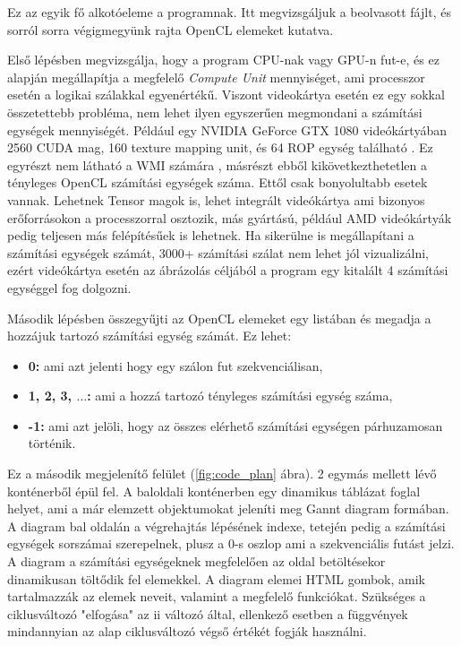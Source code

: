 Ez az egyik fő alkotóeleme a programnak. Itt megvizsgáljuk a beolvasott fájlt, és sorról sorra végigmegyünk rajta OpenCL elemeket kutatva. 

Első lépésben megvizsgálja, hogy a program CPU-nak vagy GPU-n fut-e, és ez alapján megállapítja a megfelelő \textit{Compute Unit} mennyiséget, ami processzor esetén a logikai szálakkal egyenértékű. Viszont videokártya esetén ez egy sokkal összetettebb probléma, nem lehet ilyen egyszerűen megmondani a számítási egységek mennyiségét. Például egy NVIDIA GeForce GTX 1080 videókártyában 2560 CUDA mag, 160 texture mapping unit, és 64 ROP egység található \cite{1080}. Ez egyrészt nem látható a WMI számára \cite{wmi}, másrészt ebből kikövetkezthetetlen a tényleges OpenCL számítási egységek száma. Ettől csak bonyolultabb esetek vannak. Lehetnek Tensor \cite{tensor} magok is, lehet integrált videókártya ami bizonyos erőforrásokon a processzorral osztozik, más gyártású, például AMD videókártyák pedig teljesen más felépítésűek is lehetnek. Ha sikerülne is megállapítani a számítási egységek számát, 3000+ számítási szálat nem lehet jól vizualizálni, ezért videókártya esetén az ábrázolás céljából a program egy kitalált 4 számítási egységgel fog dolgozni.

Második lépésben összegyűjti az OpenCL elemeket egy listában és megadja a hozzájuk tartozó számítási egység számát. Ez lehet:
\begin{itemize}
\item\textbf{0:}  ami azt jelenti hogy egy szálon fut szekvenciálisan,
\item\textbf{1, 2, 3, $\ldots$:}  ami a hozzá tartozó tényleges számítási egység száma,
\item\textbf{-1:}  ami azt jelöli, hogy az összes elérhető számítási egységen párhuzamosan történik.
\end{itemize}




Ez a második megjelenítő felület (\ref{fig:code_plan} ábra). 2 egymás mellett lévő konténerből épül fel.
A baloldali konténerben egy dinamikus táblázat foglal helyet, ami a már elemzett objektumokat jeleníti meg Gannt diagram formában. A diagram bal oldalán a végrehajtás lépésének indexe, tetején pedig a számítási egységek sorszámai szerepelnek, plusz a 0-s oszlop ami a szekvenciális futást jelzi. A diagram a számítási egységeknek megfelelően az oldal betöltésekor dinamikusan töltődik fel elemekkel. A diagram elemei HTML gombok, amik tartalmazzák az elemek neveit, valamint a megfelelő funkciókat. Szükséges a ciklusváltozó "elfogása" az ii változó által, ellenkező esetben a függvények mindannyian az alap ciklusváltozó végső értékét fogják használni.

